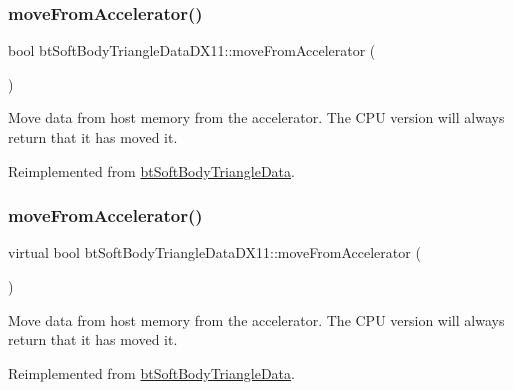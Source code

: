 \subsubsection{\texorpdfstring{move\+From\+Accelerator()}{moveFromAccelerator()}\hspace{0.1cm}{\footnotesize\ttfamily [1/2]}}
{\footnotesize\ttfamily bool bt\+Soft\+Body\+Triangle\+Data\+D\+X11\+::move\+From\+Accelerator (\begin{DoxyParamCaption}{ }\end{DoxyParamCaption})\hspace{0.3cm}{\ttfamily [virtual]}}

Move data from host memory from the accelerator. The C\+PU version will always return that it has moved it. 

Reimplemented from \hyperlink{classbtSoftBodyTriangleData_aa89f5f9a27c9350a95179535c4aaaf8c}{bt\+Soft\+Body\+Triangle\+Data}.

\mbox{\label{classbtSoftBodyTriangleDataDX11_a8b0e445184f7afe24741912aa5d93e72}} 
\subsubsection{\texorpdfstring{move\+From\+Accelerator()}{moveFromAccelerator()}\hspace{0.1cm}{\footnotesize\ttfamily [2/2]}}
{\footnotesize\ttfamily virtual bool bt\+Soft\+Body\+Triangle\+Data\+D\+X11\+::move\+From\+Accelerator (\begin{DoxyParamCaption}{ }\end{DoxyParamCaption})\hspace{0.3cm}{\ttfamily [virtual]}}

Move data from host memory from the accelerator. The C\+PU version will always return that it has moved it. 

Reimplemented from \hyperlink{classbtSoftBodyTriangleData_aa89f5f9a27c9350a95179535c4aaaf8c}{bt\+Soft\+Body\+Triangle\+Data}.

\mbox{\label{classbtSoftBodyTriangleDataDX11_aa3d2af489f6521cdd95c152f49fcedff}} 
